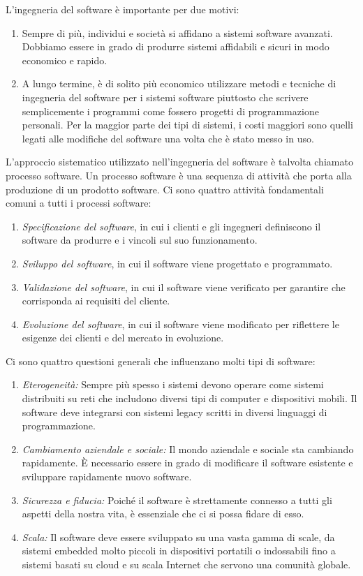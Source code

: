 L'ingegneria del software è importante per due motivi:
\begin{enumerate}
    \item Sempre di più, individui e società si affidano a sistemi software avanzati. Dobbiamo essere in grado di produrre sistemi affidabili e sicuri in modo economico e rapido.
    \item A lungo termine, è di solito più economico utilizzare metodi e tecniche di ingegneria del software per i sistemi software piuttosto che scrivere semplicemente i programmi come fossero progetti di programmazione personali. Per la maggior parte dei tipi di sistemi, i costi maggiori sono quelli legati alle modifiche del software una volta che è stato messo in uso.
\end{enumerate}
L'approccio sistematico utilizzato nell'ingegneria del software è talvolta chiamato processo software. Un processo software è una sequenza di attività che porta alla produzione di un prodotto software. Ci sono quattro attività fondamentali comuni a tutti i processi software:
\begin{enumerate}
    \item \textit{Specificazione del software}, in cui i clienti e gli ingegneri definiscono il software da produrre e i vincoli sul suo funzionamento.
    \item \textit{Sviluppo del software}, in cui il software viene progettato e programmato.
    \item \textit{Validazione del software}, in cui il software viene verificato per garantire che corrisponda ai requisiti del cliente.
    \item \textit{Evoluzione del software}, in cui il software viene modificato per riflettere le esigenze dei clienti e del mercato in evoluzione.
\end{enumerate}

Ci sono quattro questioni generali che influenzano molti tipi di software:
\begin{enumerate}
    \item \textit{Eterogeneità:} Sempre più spesso i sistemi devono operare come sistemi distribuiti su reti che includono diversi tipi di computer e dispositivi mobili. Il software deve integrarsi con sistemi legacy scritti in diversi linguaggi di programmazione.
    \item \textit{Cambiamento aziendale e sociale:} Il mondo aziendale e sociale sta cambiando rapidamente. È necessario essere in grado di modificare il software esistente e sviluppare rapidamente nuovo software.
    \item \textit{Sicurezza e fiducia:} Poiché il software è strettamente connesso a tutti gli aspetti della nostra vita, è essenziale che ci si possa fidare di esso.
    \item \textit{Scala:} Il software deve essere sviluppato su una vasta gamma di scale, da sistemi embedded molto piccoli in dispositivi portatili o indossabili fino a sistemi basati su cloud e su scala Internet che servono una comunità globale.
\end{enumerate}

